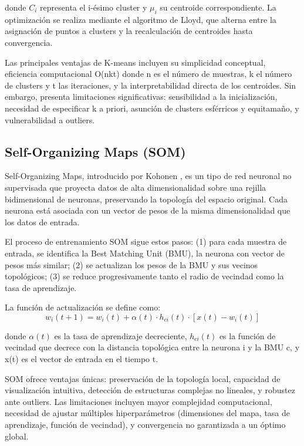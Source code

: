 \documentclass[12pt,a4paper]{article}
\begin{document}
donde $C_i$ representa el i-ésimo cluster y $\mu_i$ su centroide correspondiente. La optimización se realiza mediante el algoritmo de Lloyd, que alterna entre la asignación de puntos a clusters y la recalculación de centroides hasta convergencia.

Las principales ventajas de K-means incluyen su simplicidad conceptual, eficiencia computacional O(nkt) donde n es el número de muestras, k el número de clusters y t las iteraciones, y la interpretabilidad directa de los centroides. Sin embargo, presenta limitaciones significativas: sensibilidad a la inicialización, necesidad de especificar k a priori, asunción de clusters esférricos y equitamaño, y vulnerabilidad a outliers.

\subsection{Self-Organizing Maps (SOM)}

Self-Organizing Maps, introducido por Kohonen \cite{kohonen1982}, es un tipo de red neuronal no supervisada que proyecta datos de alta dimensionalidad sobre una rejilla bidimensional de neuronas, preservando la topología del espacio original. Cada neurona está asociada con un vector de pesos de la misma dimensionalidad que los datos de entrada.

El proceso de entrenamiento SOM sigue estos pasos: (1) para cada muestra de entrada, se identifica la Best Matching Unit (BMU), la neurona con vector de pesos más similar; (2) se actualizan los pesos de la BMU y sus vecinos topológicos; (3) se reduce progresivamente tanto el radio de vecindad como la tasa de aprendizaje.

La función de actualización se define como:
\begin{equation}
w_i(t+1) = w_i(t) + \alpha(t) \cdot h_{ci}(t) \cdot [x(t) - w_i(t)]
\end{equation}

donde $\alpha(t)$ es la tasa de aprendizaje decreciente, $h_{ci}(t)$ es la función de vecindad que decrece con la distancia topológica entre la neurona i y la BMU c, y x(t) es el vector de entrada en el tiempo t.

SOM ofrece ventajas únicas: preservación de la topología local, capacidad de visualización intuitiva, detección de estructuras complejas no lineales, y robustez ante outliers. Las limitaciones incluyen mayor complejidad computacional, necesidad de ajustar múltiples hiperparámetros (dimensiones del mapa, tasa de aprendizaje, función de vecindad), y convergencia no garantizada a un óptimo global.
\end{document}
